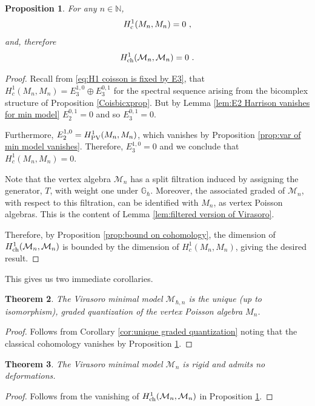 \documentclass[11pt]{amsart}
\numberwithin{equation}{section}
\newtheorem{theo}{Theorem}[section]
\newtheorem{prop}[theo]{Proposition}
\theoremstyle{definition}
\newcommand{\mc}{\mathcal}
\newcommand{\ch}{{\textup{ch}}}
\newcommand{\0}{{\textbf{0}}}
\newcommand{\MM}{{\textbf{M}}}
\def\IN{\mathbb{N}}
\def\IG{\mathbb{G}}
\def\MM{{\mc M}}
\def\ch{{\rm ch}}
\begin{document}
\begin{prop}\label{prop:coisson cohomology of minimal model}
 For any $n\in \IN$, 
 \[
 H^1_{\rm c}(M_n,M_n) =0 ~,
 \]
 and, therefore
 \[
 H^1_{\rm ch}(\MM_n,\MM_n) =0~.
 \]
\end{prop}
\begin{proof}
	Recall from \eqref{eq:H1 coisson is fixed by E3}, that $H^1_c(M_n,M_n) = E_3^{1,0}\oplus E_3^{0,1}$ for the spectral sequence arising from the bicomplex structure of Proposition \ref{Coisbicxprop}. But by Lemma \ref{lem:E2 Harrison vanishes for min model} $E_2^{0,1}=0$ and so $E_3^{0,1}=0$.

	Furthermore, $E_2^{1,0} = H_{\rm PV}^1(M_n,M_n)$, which vanishes by Proposition \ref{prop:var of min model vanishes}. Therefore, $E_3^{1,0}=0$ and we conclude that $H^1_{c}(M_n,M_n)=0$.

	Note that the vertex algebra $\MM_n$ has a split filtration induced by assigning the generator, $T$, with weight one under $\IG_\hbar$. Moreover, the associated graded of $\MM_n$, with respect to this filtration, can be identified with $M_n$, as vertex Poisson algebras. This is the content of Lemma \ref{lem:filtered version of Virasoro}.

	Therefore, by Proposition \ref{prop:bound on cohomology}, the dimension of $H^1_\ch(\MM_n,\MM_n)$ is bounded by the dimension of $H^1_c(M_n,M_n)$, giving the desired result.

\end{proof}

This gives us two immediate corollaries.

\begin{theo}
	The Virasoro minimal model $\MM_{\hbar,n}$ is the unique (up to isomorphism), graded quantization of the vertex Poisson algebra $M_n$.
\end{theo}
\begin{proof}
	Follows from Corollary \ref{cor:unique graded quantization} noting that the classical cohomology vanishes by Proposition \ref{prop:coisson cohomology of minimal model}.
\end{proof}


\begin{theo}\label{thm:rigidity of minimal model}
	The Virasoro minimal model $\MM_n$ is rigid and admits no deformations.
\end{theo}
\begin{proof}
	Follows from the vanishing of $H^1_\ch(\MM_n,\MM_n)$ in Proposition \ref{prop:coisson cohomology of minimal model}.
\end{proof}
\end{document}
